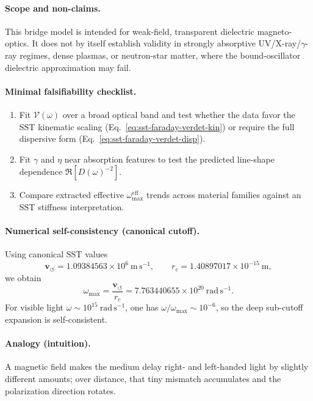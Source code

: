 \documentclass[10pt]{article}
\newcommand{\vswirl}{\mathbf{v}_{\!\boldsymbol{\circlearrowleft}}}
\newcommand{\rc}{r_c}                                    %
\begin{document}
        \paragraph{Scope and non-claims.}
            This bridge model is intended for weak-field, transparent dielectric magneto-optics. It does not by itself establish validity in strongly absorptive UV/X-ray/\(\gamma\)-ray regimes, dense plasmas, or neutron-star matter, where the bound-oscillator dielectric approximation may fail.

        \paragraph{Minimal falsifiability checklist.}
            \begin{enumerate}
                \item Fit \(\mathcal{V}(\omega)\) over a broad optical band and test whether the data favor the SST kinematic scaling (Eq.~\eqref{eq:sst-faraday-verdet-kin}) or require the full dispersive form (Eq.~\eqref{eq:sst-faraday-verdet-disp}).
                \item Fit \(\gamma\) and \(\eta\) near absorption features to test the predicted line-shape dependence \(\Re[D(\omega)^{-2}]\).
                \item Compare extracted effective \(\omega_{\max}^{\mathrm{eff}}\) trends across material families against an SST stiffness interpretation.
            \end{enumerate}

        \paragraph{Numerical self-consistency (canonical cutoff).}
            Using canonical SST values
            \[
                \vswirl = 1.09384563\times 10^6\ \mathrm{m\,s^{-1}},
                \qquad
                \rc = 1.40897017\times 10^{-15}\ \mathrm{m},
            \]
            we obtain
            \[
                \omega_{\max}=\frac{\vswirl}{\rc}=7.763440655\times 10^{20}\ \mathrm{rad\,s^{-1}}.
            \]
            For visible light \(\omega\sim 10^{15}\ \mathrm{rad\,s^{-1}}\), one has \(\omega/\omega_{\max}\sim 10^{-6}\), so the deep sub-cutoff expansion is self-consistent.

        \paragraph{Analogy (intuition).}
            A magnetic field makes the medium delay right- and left-handed light by slightly different amounts; over distance, that tiny mismatch accumulates and the polarization direction rotates.
    
\end{document}
